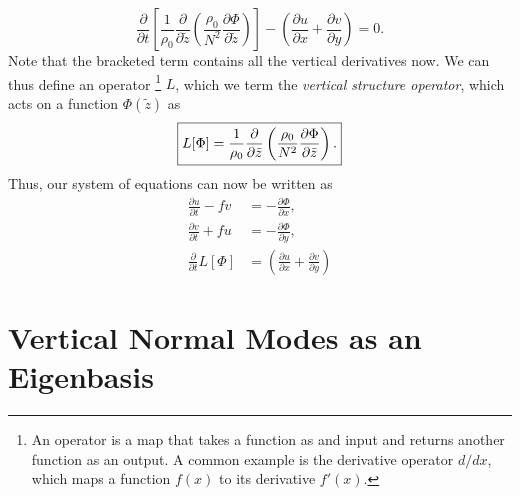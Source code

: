 \documentclass{article}
\numberwithin{equation}{section}
\newcommand{\z}{\tilde{z}}
\begin{document}
\begin{equation}
   \frac{\partial}{\partial t}\left[\frac{1}{\rho_0}\frac{\partial}{\partial\z}\left(\frac{\rho_0}{N^2}\frac{\partial\Phi}{\partial\z}\right)\right]- \left(\frac{\partial u}{\partial x} + \frac{\partial v}{\partial y}\right) = 0.
\end{equation}
%
Note that the bracketed term contains all the vertical derivatives now. We can thus define an operator
%
\footnote{An operator is a map that takes a function as and input and returns another function as an output. A common example is the derivative operator $d/dx$, which maps a function $f(x)$ to its derivative $f'(x)$.}
%
$L$, which we term the \textit{vertical structure operator}, which acts on a function $\Phi(\z)$ as
\begin{equation}
  \boxed{
  \label{eq:L_def}
  L[\Phi] = \frac{1}{\rho_0}\frac{\partial}{\partial\z}\left(\frac{\rho_0}{N^2}\frac{\partial\Phi}{\partial\z}\right).
  }
\end{equation}
%
Thus, our system of equations can now be written as
\begin{subequations}
\label{eq:system_with_L}
\begin{align}
\frac{\partial u}{\partial t} - f v &= -\frac{\partial \Phi}{\partial x},
    \label{eq:linear_system_reduced_a} \\
\frac{\partial v}{\partial t} + f u &= -\frac{\partial \Phi}{\partial y},
    \label{eq:linear_system_reduced_b} \\
\frac{\partial}{\partial t}L[\Phi] &= \left(\frac{\partial u}{\partial x} + \frac{\partial v}{\partial y}\right) 
    \label{eq:linear_system_reduced_c}
\end{align}
\end{subequations}
%

%
\section{Vertical Normal Modes as an Eigenbasis}
\end{document}
